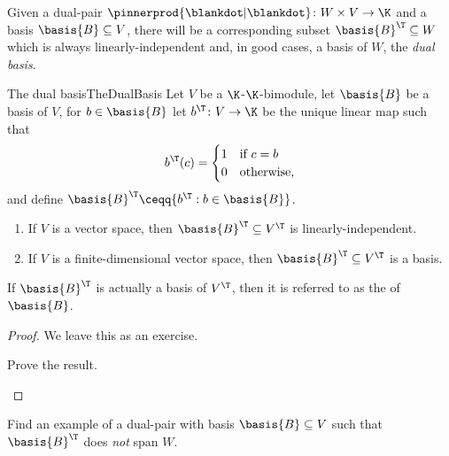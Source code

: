 Given a dual-pair $\pinnerprod{\blankdot |\blankdot}\colon W\times V\rightarrow \K$ and a basis $\basis{B}\subseteq V$, there will be a corresponding subset $\basis{B}^{\T}\subseteq W$ which is always linearly-independent and, in good cases, a basis of $W$, the \emph{dual basis}.
\begin{prp}{The dual basis}{TheDualBasis}
	Let $V$ be a $\K$-$\K$-bimodule, let $\basis{B}$ be a basis of $V$, for $b\in \basis{B}$ let $b^{\T}\colon V\rightarrow \K$ be the unique linear map such that
	\begin{equation}
	b^{\T}(c)=\begin{cases}1 & \text{if }c=b \\ 0 & \text{otherwise,}\end{cases}
	\end{equation}
	and define $\basis{B}^{\T}\ceqq \{ b^{\T}:b\in \basis{B}\}$.
	\begin{enumerate}
		\item If $V$ is a vector space, then $\basis{B}^{\T}\subseteq V^{\T}$ is linearly-independent.
		\item If $V$ is a finite-dimensional vector space, then $\basis{B}^{\T}\subseteq V^{\T}$ is a basis.
	\end{enumerate}
	\begin{rmk}
		If $\basis{B}^{\T}$ is actually a basis of $V^{\T}$, then it is referred to as the  of $\basis{B}$.
	\end{rmk}
	\begin{proof}
		We leave this as an exercise.
		\begin{exr}[breakable=false]{}{}
			Prove the result.
		\end{exr}
	\end{proof}
\end{prp}
\begin{exr}{}{}
	Find an example of a dual-pair with basis $\basis{B}\subseteq V$ such that $\basis{B}^{\T}$ does \emph{not} span $W$.
\end{exr}

